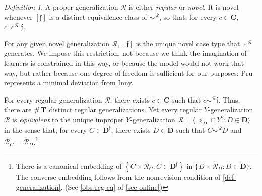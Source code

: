 \documentclass[ecta,nameyear,draft]{econsocart}
\makeatletter
\newcommand{\Ext}{\operatorname{ext}}
\newcommand{\countof}{\mathbin{\#}\hskip1pt}
\newcommand{\mc}{\mathcal}
\newcommand{\novel}{\mathfrak f}
\newcommand{\preceqb}{\mathbin{\preceq}}
\newcommand{\ext}{\mathrel{\mc R}}
\newcommand{\supext}{{\ext}}
\newcommand{\extb}{\mathbin{\mc R}}
\newcommand{\aext}{\mathrel{\acute{\mathrel{\mathcal R}}}}
\newcommand{\aextb}{\mathbin{\acute{\mathbin{\mathcal R}}}}
\newcommand{\mbbd}{{\mathbf D}}
\newcommand{\mbbdp}{{\mathbf D^{\novel}}}
\newcommand{\mbbc}{{\mathbf C}}
\newcommand{\mbbt}{{\mathbf {T}}}
\newcommand\ie{i\@.e\@ifnextchar.{}{.\@}}
\theoremstyle{plain}
\theoremstyle{remark}
\newtheorem*{definition*}{Definition}
\makeatother
\begin{document}
\begin{definition*}\label{def-novel} A proper generalization $\ext$ is either
  \emph{regular} or \emph{novel}.  It is novel whenever $[\novel]$ is a
  distinct equivalence class of $\sim^{\supext}$, so that, for every $c \in
  \mbbc$, $c \nsim^\supext \novel$.
\end{definition*}

For any given novel generalization $\ext$, $[\novel]$ is the unique novel
case type that $\sim^{\extb}$ generates.  We impose this restriction, not
because we think the imagination of learners is constrained in this way, or
because the model would not work that way, but rather because one degree of
freedom is sufficient for our purposes: {Pru} represents a minimal deviation
from Inny.


For every regular generalization $\ext$, there exists $c \in \mbbc$ such that
$c \sim^{\extb} \novel$. Thus, there are $\countof{\mbbt}$ distinct regular
generalizations. Yet every regular $Y$-generalization $\ext$ is
\emph{equivalent} to the unique improper
$Y$-generalization $\aext = \langle \preceqb_{D} \cap Y^{2}: D \in
\mbbd\rangle$ in the sense that, for every $C \in \mbbdp$, there exists $D \in
\mbbd$ such that $C \sim^{\extb} D$ and $\extb_{C} =
\aextb_{D}$.\footnote{There is a canonical embedding of $\left\{C \times
  \extb_{C}: C \in \mbbdp\right\}$
  in $\{D \times \aextb_{D}: D \in \mbbd\}$. The converse embedding follows
  from the nonrevision condition of \cref{def-generalization}. (See
\cref{obs-reg-eq} of \cref{sec-online})}
\end{document}
